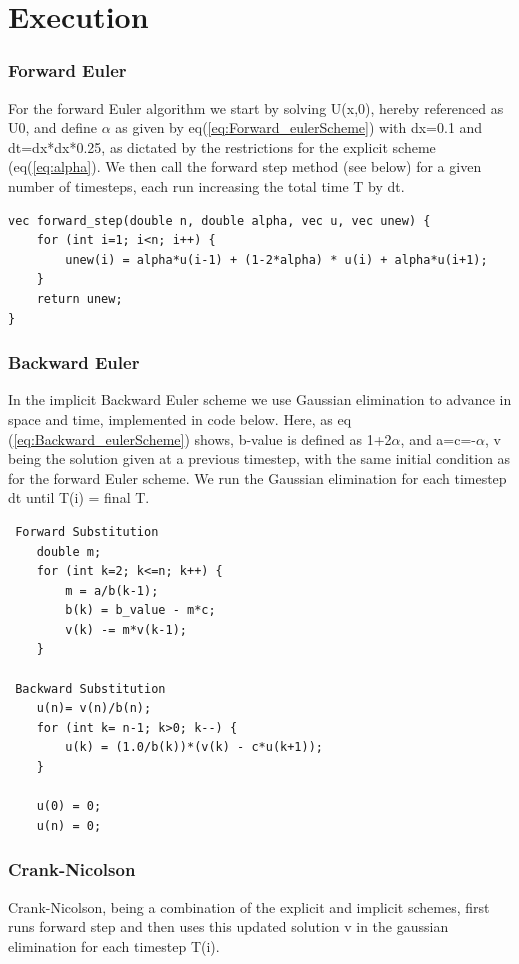\documentclass[a4paper,10pt]{article}
\begin{document}
\section{Execution}

\subsubsection{Forward Euler}
For the forward Euler algorithm we start by solving U(x,0), hereby referenced as U0, and define $\alpha$ as given by eq(\ref{eq:Forward_eulerScheme}) with dx=0.1 and dt=dx*dx*0.25, as dictated by the
restrictions for the explicit scheme (eq(\ref{eq:alpha}). We then call the forward step method (see below) for a given number of timesteps, each run increasing the total time T by dt.
\begin{verbatim}
vec forward_step(double n, double alpha, vec u, vec unew) {
    for (int i=1; i<n; i++) {
        unew(i) = alpha*u(i-1) + (1-2*alpha) * u(i) + alpha*u(i+1);
    }
    return unew;
} 
\end{verbatim}

\subsubsection{Backward Euler}
In the implicit Backward Euler scheme we use Gaussian elimination to advance in space and time, implemented in code below. Here, as eq (\ref{eq:Backward_eulerScheme}) shows, b-value is defined as
1+2$\alpha$, and a=c=-$\alpha$, v being the solution given at a previous timestep, with the same initial condition as for the forward Euler scheme. We run the Gaussian elimination for each timestep dt until T(i) = final T.

\begin{verbatim}
 Forward Substitution
    double m;
    for (int k=2; k<=n; k++) {
        m = a/b(k-1);
        b(k) = b_value - m*c;
        v(k) -= m*v(k-1);
    }

 Backward Substitution
    u(n)= v(n)/b(n);
    for (int k= n-1; k>0; k--) {
        u(k) = (1.0/b(k))*(v(k) - c*u(k+1));
    }

    u(0) = 0;
    u(n) = 0;
\end{verbatim}

\subsubsection{Crank-Nicolson}
Crank-Nicolson, being a combination of the explicit and implicit schemes, first runs forward step and then uses this updated solution v in the gaussian elimination for each timestep T(i).
\end{document}
